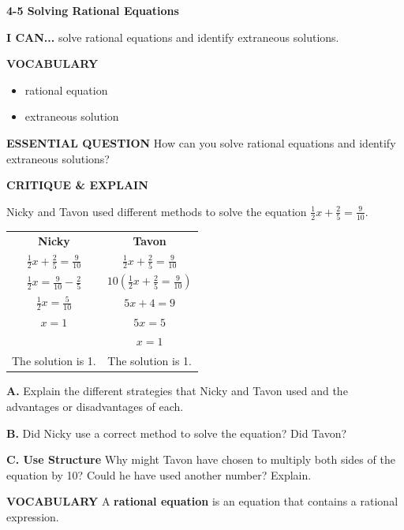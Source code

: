 \documentclass{article}
\newenvironment{lesson-meta}{}{}
\newenvironment{model-discuss}{}{}
\newenvironment{concept-box}{}{}
\begin{document}
\begin{lesson-meta}
\textbf{4-5 Solving Rational Equations}

\textbf{I CAN...} solve rational equations and identify extraneous solutions.

\textbf{VOCABULARY}
\begin{itemize}
    \item rational equation
    \item extraneous solution
\end{itemize}

\textbf{ESSENTIAL QUESTION}
How can you solve rational equations and identify extraneous solutions?
\end{lesson-meta}

\begin{model-discuss}
\textbf{CRITIQUE \& EXPLAIN}

Nicky and Tavon used different methods to solve the equation $\frac{1}{2}x + \frac{2}{5} = \frac{9}{10}$.

\begin{center}
\begin{tabular}{cc}
\textbf{Nicky} & \textbf{Tavon} \\
$\frac{1}{2}x + \frac{2}{5} = \frac{9}{10}$ & $\frac{1}{2}x + \frac{2}{5} = \frac{9}{10}$ \\[6pt]
$\frac{1}{2}x = \frac{9}{10} - \frac{2}{5}$ & $10\left(\frac{1}{2}x + \frac{2}{5} = \frac{9}{10}\right)$ \\[6pt]
$\frac{1}{2}x = \frac{5}{10}$ & $5x + 4 = 9$ \\[6pt]
$x = 1$ & $5x = 5$ \\[6pt]
& $x = 1$ \\[6pt]
The solution is 1. & The solution is 1. \\
\end{tabular}
\end{center}

\textbf{A.} Explain the different strategies that Nicky and Tavon used and the advantages or disadvantages of each.

\textbf{B.} Did Nicky use a correct method to solve the equation? Did Tavon?

\textbf{C. Use Structure} Why might Tavon have chosen to multiply both sides of the equation by 10? Could he have used another number? Explain.
\end{model-discuss}

\begin{concept-box}
\textbf{VOCABULARY}
A \textbf{rational equation} is an equation that contains a rational expression.
\end{concept-box}
\end{document}
